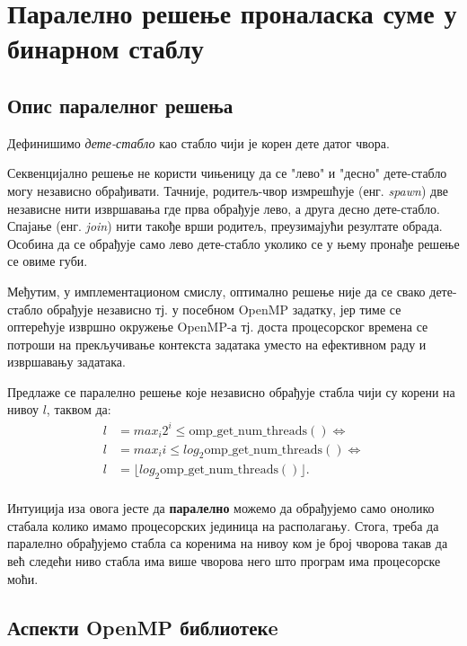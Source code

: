 \section{Паралелно решење проналаска суме у бинарном стаблу}

\subsection{Опис паралелног решења}
Дефинишимо \textit{дете-стабло} као стабло чији је корен дете датог чвора.

Секвенцијално решење не користи чињеницу да се "лево" и "десно" дете-стабло могу независно обрађивати.
Тачније, родитељ-чвор измрешћује (енг. \textit{spawn}) две независне нити извршавања где прва обрађује лево, а друга десно дете-стабло.
Спајање (енг. \textit{join}) нити такође врши родитељ, преузимајући резултате обрада.
Особина да се обрађује само лево дете-стабло уколико се у њему пронађе решење се овиме губи.

Међутим, у имплементационом смислу, оптимално решење није да се свако дете-стабло обрађује независно тј.
у посебном OpenMP задатку, јер тиме се оптерећује извршно окружење OpenMP-а тј. доста процесорског времена
се потроши на прекључивање контекста задатака уместо на ефективном раду и извршавању задатака.

Предлаже се паралелно решење које независно обрађује стабла чији су корени на нивоу $l$, таквом да:
\begin{equation}
\begin{split}
\label{eq:myequation}
    l &= max_i 2^i \leq \mathrm{omp\_get\_num\_threads()} \iff \\
    l &= max_i i \leq log_2 \mathrm{omp\_get\_num\_threads()} \iff \\
    l &= \lfloor log_2 \mathrm{omp\_get\_num\_threads()} \rfloor .\\
\end{split}
\end{equation}

Интуиција иза овога јесте да \textbf{паралелно} можемо да обрађујемо само онолико стабала колико имамо процесорских јединица на располагању.
Стога, треба да паралелно обрађујемо стабла са коренима на нивоу ком је број чворова такав да већ следећи ниво стабла има више чворова него
што програм има процесорске моћи.

\subsection{Аспекти OpenMP библиотекe}
\label{popravljena}

